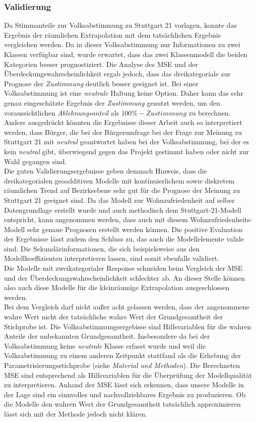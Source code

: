 \documentclass{Vorlage}
\begin{document}
\subsubsection{Validierung}
Da Stimmanteile zur Volksabstimmung zu Stuttgart 21 vorlagen, konnte das Ergebnis der räumlichen Extrapolation mit dem tatsächlichen Ergebnis vergleichen werden.
Da in dieser Volksabstimmung nur Informationen zu zwei Klassen verfügbar sind, wurde erwartet, dass das zwei Klassenmodell die beiden Kategorien besser prognostiziert. Die Analyse des MSE und der Überdeckungswahrscheinlichkeit ergab jedoch, dass das dreikategoriale zur Prognose der \textit{Zustimmung} deutlich besser geeignet ist. Bei einer Volksabstimmung ist eine \textit{neutrale} Haltung keine Option. Daher kann das sehr genau eingeschätzte Ergebnis der \textit{Zustimmung} genutzt werden, um den voraussichtlichen \textit{Ablehnungsanteil} als $100\% -\textit{Zustimmung}$ zu berechnen. Anders ausgedrückt könnten die Ergebnisse dieser Arbeit auch so interpretiert werden, dass Bürger, die bei der Bürgerumfrage bei der Frage zur Meinung zu Stuttgart 21 mit \textit{neutral} geantwortet haben bei der Volksabstimmung, bei der es kein \textit{neutral} gibt, überwiegend gegen das Projekt gestimmt haben oder nicht zur Wahl gegangen sind.\\
Die guten Validierungsergebnisse geben demnach Hinweis, dass die dreikategorialen geoadditiven Modelle mit kontinuierlichem sowie diskretem räumlichen Trend auf Bezirksebene sehr gut für die Prognose der Meinung zu Stuttgart 21 geeignet sind. Da das Modell zur Wohnzufriedenheit auf selber Datengrundlage erstellt wurde und auch methodisch dem Stuttgart-21-Modell entspricht, kann angenommen werden, dass auch mit diesem Wohnzufriedenheits-Modell sehr genaue Prognosen erstellt werden können. Die positive Evaluation der Ergebnisse lässt zudem den Schluss zu, das auch die Modellelemente valide sind. Die Sekundärinformationen, die sich beispielsweise aus den Modellkoeffizienten interpretieren lassen, sind somit ebenfalls validiert.\\
Die Modelle mit zweikategorialer Response schneiden beim Vergleich der MSE und der Über\-deckungs\-wahrscheinlichkeit schlechter ab. An dieser Stelle können also auch diese Modelle für die kleinräumige Extrapolation ausgeschlossen werden.\\
Bei dem Vergleich darf nicht außer acht gelassen werden, dass der angenommene wahre Wert nicht der tatsächliche wahre Wert der Grundgesamtheit der Stichprobe ist. Die Volksabstimmungsergebisse sind Hilfsvariablen für die wahren Anteile der unbekannten Grundgesamtheit. Insbesondere da bei der Volksabstimmung keine \textit{neutrale} Klasse erfasst wurde und weil die Volksabstimmung zu einem anderen Zeitpunkt stattfand als die Erhebung der Parametrisierungsstichprobe (siehe \textit{Material und Methoden}). Die Berechneten MSE sind entsprechend als Hilfsvariablen für die Überprüfung der Modellqualität zu interpretieren. Anhand der MSE lässt sich erkennen, dass unsere Modelle in der Lage sind ein sinnvolles und nachvollziehbares Ergebnis zu produzieren. Ob die Modelle den wahren Wert der Grundgesamtheit tatsächlich approximieren lässt sich mit der Methode jedoch nicht klären.
\end{document}
